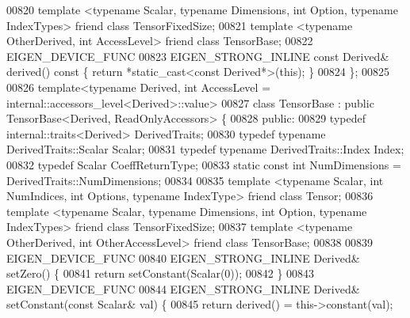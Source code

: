 \begin{DoxyCode}
00820     \textcolor{keyword}{template} <\textcolor{keyword}{typename} Scalar, \textcolor{keyword}{typename} Dimensions, \textcolor{keywordtype}{int} Option, \textcolor{keyword}{typename} IndexTypes> \textcolor{keyword}{friend} \textcolor{keyword}{class }
      TensorFixedSize;
00821     \textcolor{keyword}{template} <\textcolor{keyword}{typename} OtherDerived, \textcolor{keywordtype}{int} AccessLevel> \textcolor{keyword}{friend} \textcolor{keyword}{class }TensorBase;
00822     EIGEN\_DEVICE\_FUNC
00823     EIGEN\_STRONG\_INLINE \textcolor{keyword}{const} Derived& derived()\textcolor{keyword}{ const }\{ \textcolor{keywordflow}{return} *\textcolor{keyword}{static\_cast<}\textcolor{keyword}{const }Derived*\textcolor{keyword}{>}(\textcolor{keyword}{this}); \}
00824 \};
00825 
00826 template<typename Derived, int AccessLevel = internal::accessors\_level<Derived>::value>
00827 \textcolor{keyword}{class }TensorBase : \textcolor{keyword}{public} TensorBase<Derived, ReadOnlyAccessors> \{
00828  \textcolor{keyword}{public}:
00829     \textcolor{keyword}{typedef} internal::traits<Derived> DerivedTraits;
00830     \textcolor{keyword}{typedef} \textcolor{keyword}{typename} DerivedTraits::Scalar Scalar;
00831     \textcolor{keyword}{typedef} \textcolor{keyword}{typename} DerivedTraits::Index Index;
00832     \textcolor{keyword}{typedef} Scalar CoeffReturnType;
00833     \textcolor{keyword}{static} \textcolor{keyword}{const} \textcolor{keywordtype}{int} NumDimensions = DerivedTraits::NumDimensions;
00834 
00835     \textcolor{keyword}{template} <\textcolor{keyword}{typename} Scalar, \textcolor{keywordtype}{int} NumIndices, \textcolor{keywordtype}{int} Options, \textcolor{keyword}{typename} IndexType> \textcolor{keyword}{friend} \textcolor{keyword}{class }Tensor;
00836     \textcolor{keyword}{template} <\textcolor{keyword}{typename} Scalar, \textcolor{keyword}{typename} Dimensions, \textcolor{keywordtype}{int} Option, \textcolor{keyword}{typename} IndexTypes> \textcolor{keyword}{friend} \textcolor{keyword}{class }
      TensorFixedSize;
00837     \textcolor{keyword}{template} <\textcolor{keyword}{typename} OtherDerived, \textcolor{keywordtype}{int} OtherAccessLevel> \textcolor{keyword}{friend} \textcolor{keyword}{class }TensorBase;
00838 
00839     EIGEN\_DEVICE\_FUNC
00840     EIGEN\_STRONG\_INLINE Derived& setZero() \{
00841       \textcolor{keywordflow}{return} setConstant(Scalar(0));
00842     \}
00843     EIGEN\_DEVICE\_FUNC
00844     EIGEN\_STRONG\_INLINE Derived& setConstant(\textcolor{keyword}{const} Scalar& val) \{
00845       \textcolor{keywordflow}{return} derived() = this->constant(val);

\end{DoxyCode}

